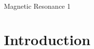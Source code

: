 

\usepackage{subcaption}


\renewcommand{\vec}[1]{\boldsymbol{#1}}
\newcommand{\mat}[1]{\boldsymbol{#1}}

\newcommand\B[1]{\ensuremath{\vec{B}_{#1}}}

\def\longtime{\ensuremath{T_1}}						%
\def\transtime{\ensuremath{T_2}}						%
\def\inhomogtime{\ensuremath{\transtime^*}}						%

\def\spatialfreq{\ensuremath{s}}      %

\def\larmorfreq{\ensuremath{f_\ell}}  %

\def\hydrogen{\ensuremath{{}^1\textrm{H}}} %

\def\magn{\ensuremath{\vec M}}
\def\magnzero{\ensuremath{\magn_0}}
\def\magnlong{\ensuremath{\magn_z}} %
\def\magntrans{\ensuremath{\magn_{xy}}} %


\subtitle{Magnetic Resonance I}





\frame[plain]{\titlepage}

\begin{frame}{Magnetic Resonance 1}

    \tableofcontents
\end{frame}



\section{Introduction}%
\label{sec:introduction}

